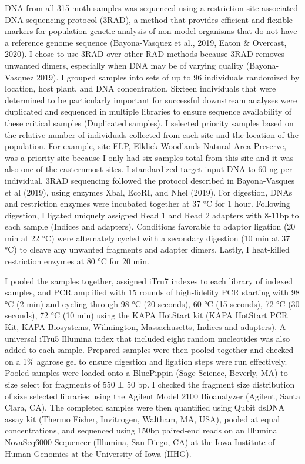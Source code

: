 DNA from all 315 moth samples was sequenced using a restriction site
associated DNA sequencing protocol (3RAD), a method that provides
efficient and flexible markers for population genetic analysis of
non-model organisms that do not have a reference genome sequence
(Bayona-Vasquez et al., 2019, Eaton \& Overcast, 2020). I chose to use
3RAD over other RAD methods because 3RAD removes unwanted dimers,
especially when DNA may be of varying quality (Bayona-Vasquez 2019). I
grouped samples into sets of up to 96 individuals randomized by
location, host plant, and DNA concentration. Sixteen individuals that
were determined to be particularly important for successful downstream
analyses were duplicated and sequenced in multiple libraries to ensure
sequence availability of these critical samples (Duplicated samples). I
selected priority samples based on the relative number of individuals
collected from each site and the location of the population. For
example, site ELP, Elklick Woodlands Natural Area Preserve, was a
priority site because I only had six samples total from this site and it
was also one of the easternmost sites. I standardized target input DNA
to 60 ng per individual. 3RAD sequencing followed the protocol described
in Bayona-Vasques et al (2019), using enzymes Xbal, EcoRI, and Nhel
(2019). For digestion, DNAs and restriction enzymes were incubated
together at 37 °C for 1 hour. Following digestion, I ligated uniquely
assigned Read 1 and Read 2 adapters with 8-11bp to each sample (Indices
and adapters). Conditions favorable to adaptor ligation (20 min at 22
°C) were alternately cycled with a secondary digestion (10 min at 37 °C)
to cleave any unwanted fragments and adapter dimers. Lastly, I
heat-killed restriction enzymes at 80 °C for 20 min.

I pooled the samples together, assigned iTru7 indexes to each library of
indexed samples, and PCR amplified with 15 rounds of high-fidelity PCR
starting with 98 °C (2 min) and cycling through 98 °C (20 seconds), 60
°C (15 seconds), 72 °C (30 seconds), 72 °C (10 min) using the KAPA
HotStart kit (KAPA HotStart PCR Kit, KAPA Biosystems, Wilmington,
Massachusetts, Indices and adapters). A universal iTru5 Illumina index
that included eight random nucleotides was also added to each sample.
Prepared samples were then pooled together and checked on a 1\% agarose
gel to ensure digestion and ligation steps were run effectively. Pooled
samples were loaded onto a BluePippin (Sage Science, Beverly, MA) to
size select for fragments of 550 ± 50 bp. I checked the fragment size
distribution of size selected libraries using the Agilent Model 2100
Bioanalyzer (Agilent, Santa Clara, CA). The completed samples were then
quantified using Qubit dsDNA assay kit (Thermo Fisher, Invitrogen,
Waltham, MA, USA), pooled at equal concentrations, and sequenced using
150bp paired-end reads on an Illumina NovaSeq6000 Sequencer (Illumina,
San Diego, CA) at the Iowa Institute of Human Genomics at the University
of Iowa (IIHG).

